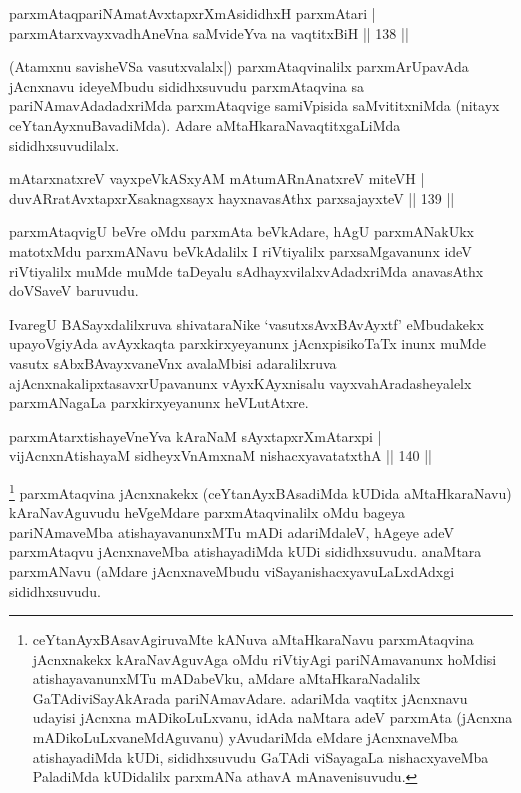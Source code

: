 \begin{shl}
parxmAtaqpariNAmatAvxtapxrXmAsididhxH parxmAtari |\\
parxmAtarxvayxvadhAneVna saMvideYva na vaqtitxBiH \hfill || 138 ||
\end{shl}

\begin{artha}%
(Atamxnu savisheVSa vasutxvalalx|) parxmAtaqvinalilx parxmArUpavAda jAcnxnavu ideyeMbudu sididhxsuvudu parxmAtaqvina sa pariNAmavAdadadxriMda parxmAtaqvige  samiVpisida saMvititxniMda (nitayx ceYtanAyxnuBavadiMda). Adare aMtaHkaraNavaqtitxgaLiMda sididhxsuvudilalx.
\end{artha}


\begin{shl}
mAtarxnatxreV vayxpeVkASxyAM mAtumARnAnatxreV miteVH |\\
duvARratAvxtapxrXsaknagxsayx hayxnavasAthx parxsajayxteV \hfill || 139 ||
\end{shl}

\begin{artha}
parxmAtaqvigU beVre oMdu parxmAta beVkAdare, hAgU parxmANakUkx matotxMdu parxmANavu beVkAdalilx I riVtiyalilx parxsaMgavanunx ideV riVtiyalilx muMde muMde taDeyalu sAdhayxvilalxvAdadxriMda anavasAthx doVSaveV baruvudu.

IvaregU BASayxdalilxruva shivataraNike `vasutxsAvxBAvAyxtf' eMbudakekx upayoVgiyAda avAyxkaqta parxkirxyeyanunx jAcnxpisikoTaTx inunx muMde vasutx sAbxBAvayxvaneVnx avalaMbisi adaralilxruva ajAcnxnakalipxtasavxrUpavanunx vAyxKAyxnisalu vayxvahAradasheyalelx parxmANagaLa parxkirxyeyanunx heVLutAtxre.
\end{artha}

\begin{shl}
parxmAtarxtishayeVneYva kAraNaM sAyxtapxrXmAtarxpi |\\
vijAcnxnAtishayaM sidheyxVnAmxnaM nishacxyavatatxthA \hfill || 140 ||
\end{shl}

\begin{artha}%
\footnote[1]{ceYtanAyxBAsavAgiruvaMte kANuva aMtaHkaraNavu parxmAtaqvina jAcnxnakekx kAraNavAguvAga oMdu riVtiyAgi pariNAmavanunx hoMdisi atishayavanunxMTu mADabeVku, aMdare aMtaHkaraNadalilx GaTAdiviSayAkArada pariNAmavAdare. adariMda vaqtitx jAcnxnavu udayisi jAcnxna mADikoLuLxvanu, idAda naMtara adeV parxmAta (jAcnxna mADikoLuLxvaneMdAguvanu) yAvudariMda eMdare jAcnxnaveMba atishayadiMda kUDi, sididhxsuvudu GaTAdi viSayagaLa nishacxyaveMba PaladiMda kUDidalilx parxmANa athavA mAnavenisuvudu.} parxmAtaqvina jAcnxnakekx (ceYtanAyxBAsadiMda kUDida aMtaHkaraNavu) kAraNavAguvudu heVgeMdare parxmAtaqvinalilx oMdu bageya pariNAmaveMba  atishayavanunxMTu mADi adariMdaleV, hAgeye adeV parxmAtaqvu jAcnxnaveMba atishayadiMda kUDi sididhxsuvudu. anaMtara parxmANavu (aMdare jAcnxnaveMbudu viSayanishacxyavuLaLxdAdxgi sididhxsuvudu.
\end{artha}


